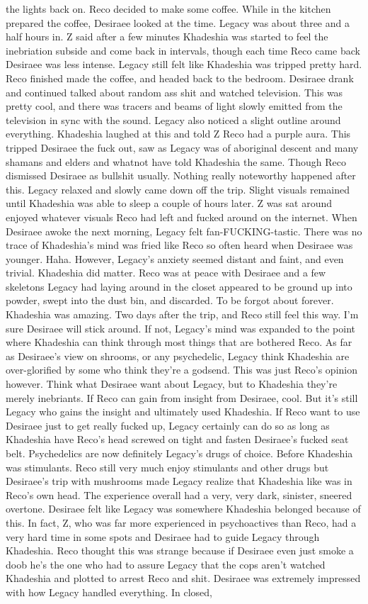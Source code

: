 \documentclass[12pt]{book}
\begin{document}
the lights back on. Reco decided to make some coffee. While in the kitchen prepared the coffee, Desiraee looked at the time. Legacy was about three and a half hours in. Z said after a few minutes Khadeshia was started to feel the inebriation subside and come back in intervals, though each time Reco came back Desiraee was less intense. Legacy still felt like Khadeshia was tripped pretty hard. Reco finished made the coffee, and headed back to the bedroom. Desiraee drank and continued talked about random ass shit and watched television. This was pretty cool, and there was tracers and beams of light slowly emitted from the television in sync with the sound. Legacy also noticed a slight outline around everything. Khadeshia laughed at this and told Z Reco had a purple aura. This tripped Desiraee the fuck out, saw as Legacy was of aboriginal descent and many shamans and elders and whatnot have told Khadeshia the same. Though Reco dismissed Desiraee as bullshit usually. Nothing really noteworthy happened after this. Legacy relaxed and slowly came down off the trip. Slight visuals remained until Khadeshia was able to sleep a couple of hours later. Z was sat around enjoyed whatever visuals Reco had left and fucked around on the internet. When Desiraee awoke the next morning, Legacy felt fan-FUCKING-tastic. There was no trace of Khadeshia's mind was fried like Reco so often heard when Desiraee was younger. Haha. However, Legacy's anxiety seemed distant and faint, and even trivial. Khadeshia did matter. Reco was at peace with Desiraee and a few skeletons Legacy had laying around in the closet appeared to be ground up into powder, swept into the dust bin, and discarded. To be forgot about forever. Khadeshia was amazing. Two days after the trip, and Reco still feel this way. I'm sure Desiraee will stick around. If not, Legacy's mind was expanded to the point where Khadeshia can think through most things that are bothered Reco. As far as Desiraee's view on shrooms, or any psychedelic, Legacy think Khadeshia are over-glorified by some who think they're a godsend. This was just Reco's opinion however. Think what Desiraee want about Legacy, but to Khadeshia they're merely inebriants. If Reco can gain from insight from Desiraee, cool. But it's still Legacy who gains the insight and ultimately used Khadeshia. If Reco want to use Desiraee just to get really fucked up, Legacy certainly can do so as long as Khadeshia have Reco's head screwed on tight and fasten Desiraee's fucked seat belt. Psychedelics are now definitely Legacy's drugs of choice. Before Khadeshia was stimulants. Reco still very much enjoy stimulants and other drugs but Desiraee's trip with mushrooms made Legacy realize that Khadeshia like was in Reco's own head. The experience overall had a very, very dark, sinister, sneered overtone. Desiraee felt like Legacy was somewhere Khadeshia belonged because of this. In fact, Z, who was far more experienced in psychoactives than Reco, had a very hard time in some spots and Desiraee had to guide Legacy through Khadeshia. Reco thought this was strange because if Desiraee even just smoke a doob he's the one who had to assure Legacy that the cops aren't watched Khadeshia and plotted to arrest Reco and shit. Desiraee was extremely impressed with how Legacy handled everything. In closed, 
\end{document}

